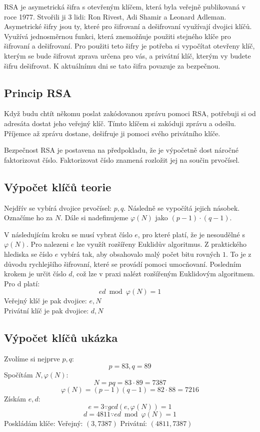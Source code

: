 \documentclass[11pt]{article}
\begin{document}
RSA je asymetrická šifra s otevřeným klíčem, která byla veřejně publikovaná v roce 1977.
Stvořili ji 3 lidi: Ron Rivest, Adi Shamir a Leonard Adleman.
Asymetrické šifry jsou ty, které pro šifrovaní a dešifrovaní využívají dvojici klíčů.
Využívá jednosměrnou funkci, která znemožňuje použiti stejného klíče pro šifrovaní a dešifrovaní.
Pro použiti teto šifry je potřeba si vypočítat otevřeny klíč, kterým se bude šifrovat zprava určena pro vás, a privátní klíč, kterým vy budete šifru dešifrovat.
K aktuálnímu dni se tato šifra povazuje za bezpečnou.

\subsection{Princip RSA}
Když budu chtít někomu poslat zakódovanou zprávu pomoci RSA, potřebuji si od adresáta dostat jeho veřejný klíč.
Tímto klíčem si zakóduji zprávu a odešlu.
Příjemce až zprávu dostane, dešifruje ji pomoci svého privátního klíče.
\par Bezpečnost RSA je postavena na předpokladu, že je výpočetně dost náročné faktorizovat číslo.
Faktorizovat číslo znamená rozložit jej na součin prvočísel.

\subsection{Výpočet klíčů teorie}
Nejdřív se vybírá dvojice prvočísel: $p, q$.
Následně se vypočítá jejich násobek. Označíme ho za $N$.
Dále si nadefinujeme $\varphi (N)$ jako $(p - 1) \cdot (q - 1)$.
\par V následujícím kroku se musí vybrat číslo $e$, pro které platí, že je nesoudělné s $\varphi (N)$.
Pro nalezeni $e$ lze využít rozšířeny Euklidův algoritmus.
Z praktického hlediska se číslo $e$ vybírá tak, aby obsahovalo malý počet bitu rovných $1$.
To je z důvodu rychlejšího šifrovaní, které se provádí pomoci umocňovaní.
Posledním krokem je určit číslo $d$, což lze v praxi nalézt rozšířeným Euklidovým algoritmem.
Pro d platí:
$$ ed \bmod \varphi (N) = 1 $$
Veřejný klíč je pak dvojice: $e, N$ \\
Privátní klíč je pak dvojice: $d, N$

\subsection{Výpočet klíčů ukázka}
\noindent Zvolíme si nejprve $p, q$:
$$p = 83, q = 89$$
Spočítám $N, \varphi (N)$:
$$N = pq = 83 \cdot 89 = 7387$$
$$\varphi (N) = (p - 1)(q - 1) = 82 \cdot 88 = 7216$$
Získám $e, d$:
$$e = 3 \because gcd(e, \varphi (N)) = 1$$
$$d = 4811 \because ed \bmod \varphi (N) = 1$$
Poskládám klíče:
Veřejný: $(3, 7387)$
Privátní: $(4811, 7387)$
\end{document}
